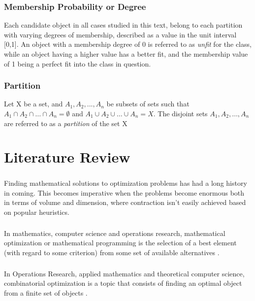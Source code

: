 \documentclass[a4paper,openany]{book}
\begin{document}
            \subsection{Membership Probability or Degree}
               Each candidate object in all cases studied in this text, belong to each partition with varying degrees of membership, described as a value in the unit interval [0,1]. An object with a membership degree of 0 is referred to as \textit{unfit} for the class, while an object having a higher value has a better fit, and the membership value of 1 being a perfect fit into the class in question.
            \subsection{Partition}
               Let X be a set, and $A_1, A_2,...,A_n$ be subsets of sets such that $A_1 \cap A_2 \cap \dots \cap A_n = \emptyset$ and $A_1 \cup A_2 \cup \dots \cup A_n = X$. The disjoint sets $A_1, A_2, \dots, A_n$ are referred to as a \textit{partition} of the set X
	\chapter{Literature Review}
		\paragraph{}
			Finding mathematical solutions to optimization problems has had a long history in coming. This becomes imperative when the problems become enormous both in terms of volume and dimension, where contraction isn't easily achieved based on popular heuristics.
		\paragraph{}
			In mathematics, computer science and operations research, mathematical optimization or mathematical programming is the selection of a best element (with regard to some criterion) from some set of available alternatives \cite{arjang}. 
		\paragraph{}
			In Operations Research, applied mathematics and theoretical computer science, combinatorial optimization is a topic that consists of finding an optimal object from a finite set of objects \cite{schrijver2}.
\end{document}
